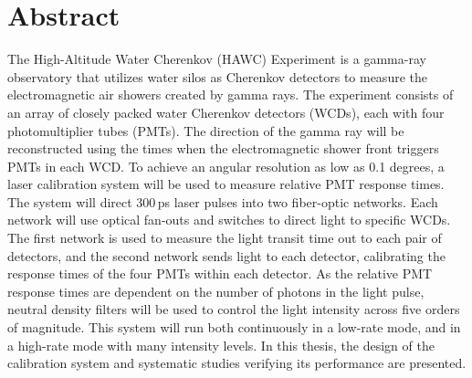 \cleartooddpage[\thispagestyle{empty}]
\section*{Abstract}

The High-Altitude Water Cherenkov (HAWC) Experiment is a gamma-ray observatory that utilizes water silos as Cherenkov detectors to measure the electromagnetic air showers created by gamma rays.
The experiment consists of an array of closely packed water Cherenkov detectors (WCDs), each with four photomultiplier tubes (PMTs).
The direction of the gamma ray will be reconstructed using the times when the electromagnetic shower front triggers PMTs in each WCD.
To achieve an angular resolution as low as 0.1 degrees, a laser calibration system will be used to measure relative PMT response times.
The system will direct 300$\,$ps laser pulses into two fiber-optic networks.
Each network will use optical fan-outs and switches to direct light to specific WCDs.
The first network is used to measure the light transit time out to each pair of detectors, and the second network sends light to each detector, calibrating the response times of the four PMTs within each detector.
As the relative PMT response times are dependent on the number of photons in the light pulse, neutral density filters will be used to control the light intensity across five orders of magnitude.
This system will run both continuously in a low-rate mode, and in a high-rate mode with many intensity levels.
In this thesis, the design of the calibration system and systematic studies verifying its performance are presented.



\cleartoevenpage[\thispagestyle{plain}]
\null
